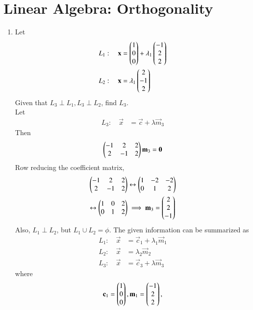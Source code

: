 \documentclass[journal,12pt,twocolumn]{IEEEtran}
\renewcommand\thesection{\arabic{section}}
\begin{document}
\section{Linear Algebra: Orthogonality}
\begin{enumerate}[label=\thesection.\arabic*
,ref=\thesection.\theenumi]

\item Let
\begin{align}
L_1: \quad \mathbf{x} &= \begin{pmatrix}1 \\ 0 \\ 0\end{pmatrix} + \lambda_1 \begin{pmatrix}-1 \\ 2 \\ 2\end{pmatrix}
\\
L_2: \quad \mathbf{x} &=  \lambda_1 \begin{pmatrix}2 \\-1 \\ 2\end{pmatrix}
\end{align}
%
Given that  $L_3 \perp L_1, L_3 \perp L_2$, find $L_3$.
\\
\solution Let 
\begin{align}
L_3: \quad \vec{x} &= \vec{c}+ \lambda \vec{m}_3
\end{align}
% 
Then
\begin{align}
\begin{pmatrix}-1 & 2 & 2
\\
2 &-1 & 2\end{pmatrix}\mathbf{m}_3 = \mathbf{0}
\end{align}
%
Row reducing the coefficient matrix,
\begin{align}
\begin{pmatrix}-1 & 2 & 2
\\
2 &-1 & 2\end{pmatrix} &\leftrightarrow 
\begin{pmatrix}1 & -2 & -2
\\
0 &1 & 2\end{pmatrix} 
\\
\leftrightarrow 
\begin{pmatrix}1 & 0 & 2
\\
0 &1 & 2\end{pmatrix} 
& \implies \mathbf{m}_3 = \begin{pmatrix}2 \\ 2 \\ -1\end{pmatrix}
\end{align}
%
Also, $L_1\perp L_2$, but $L_1 \cup L_2 = \phi$. The given information can be summarized as
\begin{align}
\label{eq:12-given1}
L_1: \quad \vec{x} &= \vec{c}_1 + \lambda_1 \vec{m}_1
\\
L_2: \quad \vec{x} &=  \lambda_2 \vec{m}_2
\\
L_3: \quad \vec{x} &= \vec{c}_3 + \lambda \vec{m}_3
\label{eq:12-given3}
\end{align}
%
where
\begin{align}
\label{eq:12-given12}
\vec{c}_1 = \myvec{1 \\ 0 \\ 0}, \vec{m}_1=  \myvec{-1 \\ 2 \\ 2},

\end{align}
\end{enumerate}
\end{document}
